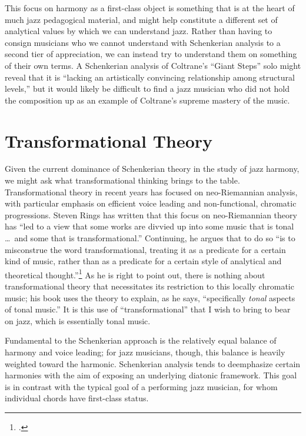 \documentclass[diss]{subfiles}
\begin{document}
This focus on harmony as a first-class object is something that is at the
heart of much jazz pedagogical material, and might help constitute a different
set of analytical values by which we can understand jazz. Rather than having
to consign musicians who we cannot understand with Schenkerian analysis to a
second tier of appreciation, we can instead try to understand them on
something of their own terms. A Schenkerian analysis of Coltrane’s “Giant
Steps” solo might reveal that it is “lacking an artistically convincing
relationship among structural levels,” but it would likely be difficult to
find a jazz musician who did not hold the composition up as an example of Coltrane’s
supreme mastery of the music.


\section{Transformational Theory}
\label{sec:transformational-theory} %

Given the current dominance of Schenkerian theory in the study of jazz
harmony, we might ask what transformational thinking brings to the table.
Transformational theory in recent years has focused on neo-Riemannian
analysis, with particular emphasis on efficient voice leading and
non-functional, chromatic progressions. Steven Rings has written that this
focus on neo-Riemannian theory has “led to a view that some works are divvied
up into some music that is tonal \ldots\ and some that is transformational.”
Continuing, he argues that to do so “is to misconstrue the word
transformational, treating it as a predicate for a certain kind of music,
rather than as a predicate for a certain style of analytical and theoretical
thought.”\footcite[9]{rings:2011} As he is right to point out, there is
nothing about transformational theory that necessitates its restriction to
this locally chromatic music; his book uses the theory to explain, as he says,
“specifically \emph{tonal} aspects of tonal music.” It is this use of
“transformational” that I wish to bring to bear on jazz, which is essentially
tonal music.

Fundamental to the Schenkerian approach is the relatively equal balance of
harmony and voice leading; for jazz musicians, though, this balance is heavily
weighted toward the harmonic.  Schenkerian analysis tends to deemphasize
certain harmonies with the aim of exposing an underlying diatonic framework.
This goal is in contrast with the typical goal of a performing jazz musician,
for whom individual chords have first-class status.
\end{document}

